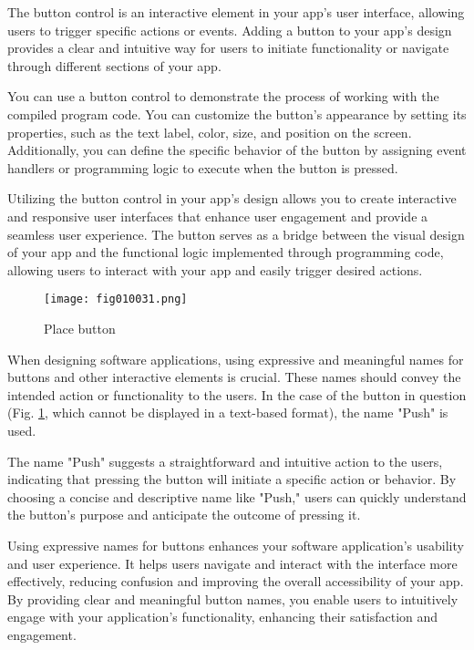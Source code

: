 The button control is an interactive element in your app's user interface, allowing users to trigger specific actions or events. Adding a button to your app's design provides a clear and intuitive way for users to initiate functionality or navigate through different sections of your app.

You can use a button control to demonstrate the process of working with the compiled program code. You can customize the button's appearance by setting its properties, such as the text label, color, size, and position on the screen. Additionally, you can define the specific behavior of the button by assigning event handlers or programming logic to execute when the button is pressed.

Utilizing the button control in your app's design allows you to create interactive and responsive user interfaces that enhance user engagement and provide a seamless user experience. The button serves as a bridge between the visual design of your app and the functional logic implemented through programming code, allowing users to interact with your app and easily trigger desired actions.

\begin{figure}[H]
   \centering
   \texttt{[image: fig010031.png]}
   \caption{Place button}
\label{fig010031}
\end{figure}

When designing software applications, using expressive and meaningful names for buttons and other interactive elements is crucial. These names should convey the intended action or functionality to the users. In the case of the button in question (Fig. \ref{fig010031}, which cannot be displayed in a text-based format), the name "Push" is used.

The name "Push" suggests a straightforward and intuitive action to the users, indicating that pressing the button will initiate a specific action or behavior. By choosing a concise and descriptive name like "Push," users can quickly understand the button's purpose and anticipate the outcome of pressing it.

Using expressive names for buttons enhances your software application's usability and user experience. It helps users navigate and interact with the interface more effectively, reducing confusion and improving the overall accessibility of your app. By providing clear and meaningful button names, you enable users to intuitively engage with your application's functionality, enhancing their satisfaction and engagement.

